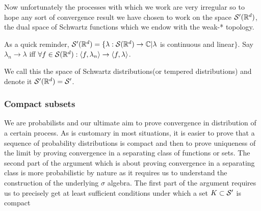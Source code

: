 \documentclass[../main.tex]{subfiles}
\begin{document}
Now unfortunately the processes with which we work are very irregular so to hope any sort of convergence result we have chosen to work on the space ${\mathcal S}'(\mathbb{R}^d)$, the dual space of Schwartz functions which we endow with the weak-* topology.

As a quick reminder, ${\mathcal S}'(\mathbb{R}^d)=\{\lambda:{\mathcal S}(\mathbb{R}^d)\rightarrow\mathbb{C}|\lambda$ is continuous and linear$\}$.
Say $\lambda_n\rightarrow\lambda$ iff $\forall f\in{\mathcal S}(\mathbb{R}^d):\langle f,\lambda_n\rangle\rightarrow\langle f,\lambda\rangle$.

We call this the space of Schwartz distributions(or tempered distributions) and denote it ${\mathcal S}'(\mathbb{R}^d)={\mathcal S}'$.
\subsubsection{Compact subsets}
We are probabilists and our ultimate aim to prove convergence in distribution of a certain process. 
As is customary in most situations, it is easier to prove that a sequence of probability distributions is compact and then to prove uniqueness of the limit by proving convergence in a separating class of functions or sets. 
The second part of the argument which is about proving convergence in a separating class is more probabilistic by nature as it requires us to understand the construction of the underlying $\sigma$ algebra.
The first part of the argument requires us to precisely get at least sufficient conditions under which a set $K\subset {\mathcal S}'$ is compact
\end{document}
